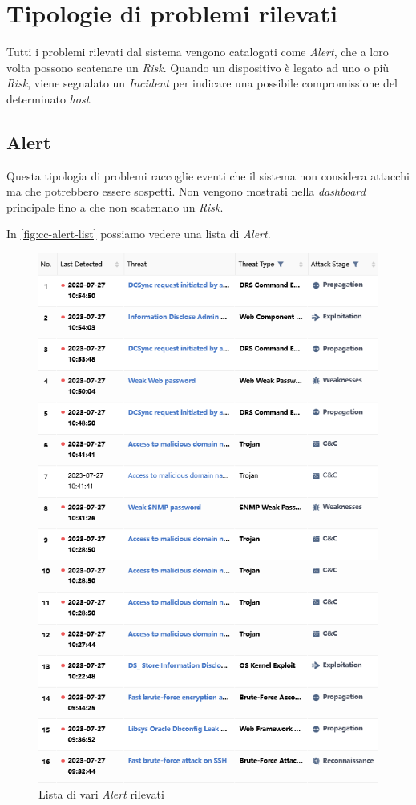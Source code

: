 \section{Tipologie di problemi rilevati}

Tutti i problemi rilevati dal sistema vengono catalogati come \emph{Alert}, che a loro volta possono scatenare un \emph{Risk}. Quando un dispositivo è legato ad uno o più \emph{Risk}, viene segnalato un \emph{Incident} per indicare una possibile compromissione del determinato \emph{host}.

\subsection{Alert}

Questa tipologia di problemi raccoglie eventi che il sistema non considera attacchi ma che potrebbero essere sospetti. Non vengono mostrati nella \emph{dashboard} principale fino a che non scatenano un \emph{Risk}.

In \autoref{fig:cc-alert-list} possiamo vedere una lista di \emph{Alert}.

\begin{figure}[!htbp]
    \centering
    \includegraphics[width=\linewidth]{images/ndr/alert.png}
    \caption{Lista di vari \emph{Alert} rilevati}
    \label{fig:cc-alert-list}
\end{figure}

